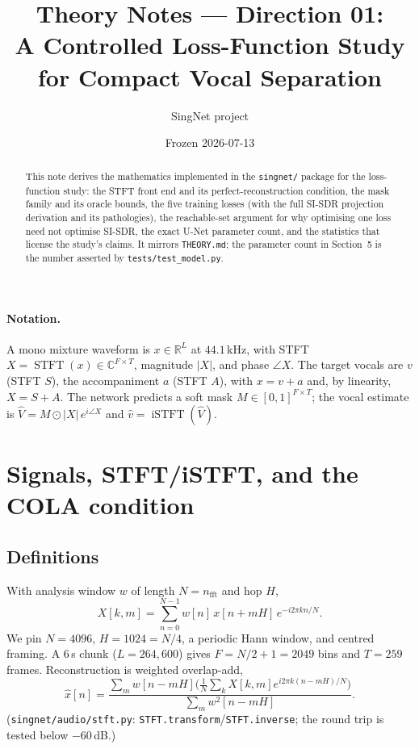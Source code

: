 \documentclass[11pt]{article}
\title{Theory Notes --- Direction 01:\\ A Controlled Loss-Function Study for
Compact Vocal Separation}
\author{SingNet project}
\date{Frozen 2026-07-13}
\newcommand{\code}[1]{\texttt{#1}}
\newcommand{\STFT}{\operatorname{STFT}}
\newcommand{\iSTFT}{\operatorname{iSTFT}}
\begin{document}
\maketitle

\begin{abstract}
This note derives the mathematics implemented in the \code{singnet/} package for
the loss-function study: the STFT front end and its perfect-reconstruction
condition, the mask family and its oracle bounds, the five training losses (with
the full SI-SDR projection derivation and its pathologies), the reachable-set
argument for why optimising one loss need not optimise SI-SDR, the exact U-Net
parameter count, and the statistics that license the study's claims. It mirrors
\code{THEORY.md}; the parameter count in Section~5 is the number asserted by
\code{tests/test\_model.py}.
\end{abstract}

\paragraph{Notation.} A mono mixture waveform is $x\in\mathbb R^{L}$ at
$44.1$\,kHz, with STFT $X=\STFT(x)\in\mathbb C^{F\times T}$, magnitude $|X|$, and
phase $\angle X$. The target vocals are $v$ (STFT $S$), the accompaniment $a$
(STFT $A$), with $x=v+a$ and, by linearity, $X=S+A$. The network predicts a soft
mask $M\in[0,1]^{F\times T}$; the vocal estimate is
$\widehat V=M\odot|X|\,e^{i\angle X}$ and $\hat v=\iSTFT(\widehat V)$.

\section{Signals, STFT/iSTFT, and the COLA condition}

\subsection{Definitions}
With analysis window $w$ of length $N=n_{\mathrm{fft}}$ and hop $H$,
\[
X[k,m]=\sum_{n=0}^{N-1}w[n]\,x[n+mH]\,e^{-i2\pi kn/N}.
\]
We pin $N=4096$, $H=1024=N/4$, a periodic Hann window, and centred framing. A
$6$\,s chunk ($L=264{,}600$) gives $F=N/2+1=2049$ bins and $T=259$ frames.
Reconstruction is weighted overlap-add,
\[
\hat x[n]=\frac{\sum_m w[n-mH]\bigl(\tfrac1N\sum_k X[k,m]e^{i2\pi k(n-mH)/N}\bigr)}
{\sum_m w^2[n-mH]}.
\]
(\code{singnet/audio/stft.py}: \code{STFT.transform}/\code{STFT.inverse}; the
round trip is tested below $-60$\,dB.)
\end{document}
